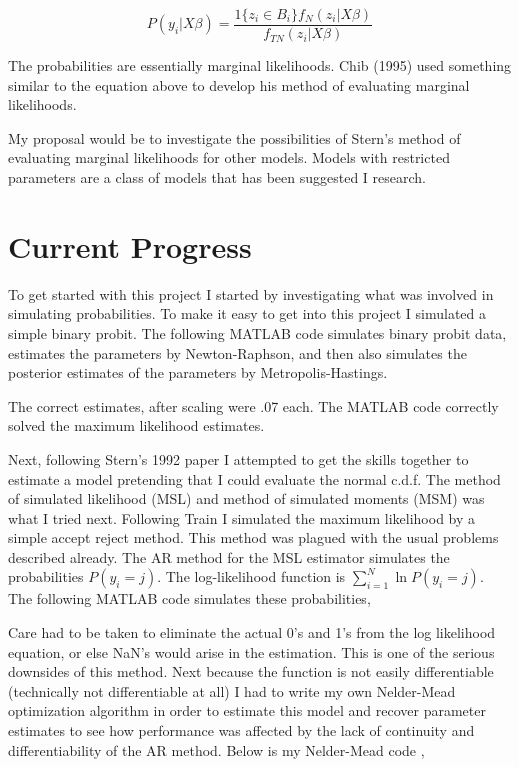 \documentclass[]{article}
\begin{document}
\[ P(y_i | X\beta) = \frac{ 1\{z_i\in B_i\} f_N(z_i|X\beta)  } { f_{TN}(z_i|X\beta) }    \]

The probabilities are essentially marginal likelihoods. Chib (1995) \cite{chib1995} used something similar to the equation above to develop his method of evaluating marginal likelihoods.

My proposal would be to investigate the possibilities of Stern's method of evaluating marginal likelihoods for other models. Models with restricted parameters are a class of models that has been suggested I research. 

\section*{Current Progress} To get started with this project I started by investigating what was involved in simulating probabilities. To make it easy to get into this project I simulated a simple binary probit. The following MATLAB code simulates binary probit data, estimates the parameters by Newton-Raphson, and then also simulates the posterior estimates of the parameters by Metropolis-Hastings. 




The correct estimates, after scaling were .07 each. The MATLAB code correctly solved the maximum likelihood estimates. 

Next, following Stern's 1992 \cite{stern1992} paper I attempted to get the skills together to estimate a model pretending that I could evaluate the normal c.d.f. The method of simulated likelihood (MSL) and method of simulated moments (MSM) was what I tried next. Following Train \cite{train}  I simulated the maximum likelihood by a simple accept reject method. This method was plagued with the usual problems described already. The AR method for the MSL estimator simulates the probabilities $ P(y_i=j) $. The log-likelihood function is $ \sum_{i=1}^{N} \ln P(y_i=j) $. The following MATLAB code simulates these probabilities, 




Care had to be taken to eliminate the actual 0's and 1's from the log likelihood equation, or else NaN's would arise in the estimation. This is one of the serious downsides of this method. Next because the function is not easily differentiable (technically not differentiable at all) I had to write my own Nelder-Mead optimization algorithm in order to estimate this model and recover parameter estimates to see how performance was affected by the lack of continuity and differentiability of the AR method. Below is my Nelder-Mead code \cite{nelderMeadAdaptive} \cite{numericalMatlab}, 
\end{document}
